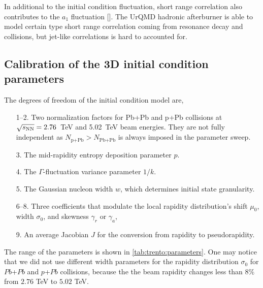 In additional to the initial condition fluctuation, short range correlation also contributes to the $a_1$ fluctuation [].
The UrQMD hadronic afterburner is able to model certain type short range correlation coming from resonance decay and collisions, but jet-like correlations is hard to accounted for.

\subsection{Calibration of the 3D initial condition parameters}
The degrees of freedom of the initial condition model are,
\begin{itemize}[itemsep=0pt]
  \item[1--2.] Two normalization factors for Pb+Pb and p+Pb collisions at $\sqrt{s_\mathrm{NN}}=2.76$~TeV and 5.02~TeV beam energies. They are not fully independent as $N_{\textrm{p+Pb}} > N_{\textrm{Pb+Pb}}$ is always imposed in the parameter sweep.
  \item[3.] The mid-rapidity entropy deposition parameter $p$.
  \item[4.] The $\Gamma$-fluctuation variance parameter $1/k$.
  \item[5.] The Gaussian nucleon width $w$, which determines initial state granularity.
  \item[6--8.] Three coefficients that modulate the local rapidity distribution's shift $\mu_0$, width $\sigma_0$, and skewness $\gamma_r$ or $\gamma_a$,
  \item[9.] An average Jacobian $J$ for the conversion from rapidity to pseudorapidity.
\end{itemize}
The range of the parameters is shown in \ref{tab:trento:parameters}.
One may notice that we did not use different width parameters for the rapidity distribution $\sigma_0$ for $Pb$+$Pb$ and $p$+$Pb$ collisions, because the the beam rapidity changes less than $8\%$ from $2.76$ TeV to $5.02$ TeV.

